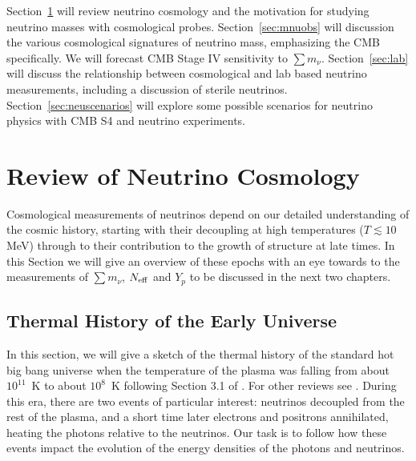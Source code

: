 Section~\ref{sec:neureview} will review neutrino cosmology and the motivation for studying neutrino masses with cosmological probes.  Section~\ref{sec:mnuobs} will discussion the various cosmological signatures of neutrino mass, emphasizing the CMB specifically.  We will forecast CMB Stage IV sensitivity to $\sum m_\nu$.  Section~\ref{sec:lab} will discuss the relationship between cosmological and lab based neutrino measurements, including a discussion of sterile neutrinos.  Section~\ref{sec:neuscenarios} will explore some possible scenarios for neutrino physics with CMB S4 and neutrino experiments.

\section{ Review of Neutrino Cosmology}\label{sec:neureview}

Cosmological measurements of neutrinos depend on our detailed understanding of the cosmic history, starting with their decoupling at high temperatures ($T \lesssim 10$ MeV) through to their contribution to the growth of structure at late times.  In this Section we will give an overview of these epochs with an eye towards to the measurements of $\sum m_\nu$, $N_{\rm eff}$ and $Y_p$ to be discussed in the next two chapters.  

\subsection{Thermal History of the Early Universe} \label{ThermalHistory}
In this section, we will give a sketch of the thermal history of the standard hot big bang universe when the temperature of the plasma was falling from about $10^{11}$~K to about $10^8$~K following Section 3.1 of \cite{Weinberg:2008zzc}.  For other reviews see \cite{Dolgov:2002wy,Agashe:2014kda}.  During this era, there are two events of particular interest: neutrinos decoupled from the rest of the plasma, and a short time later electrons and positrons annihilated, heating the photons relative to the neutrinos.  Our task is to follow how these events impact the evolution of the energy densities of the photons and neutrinos.

